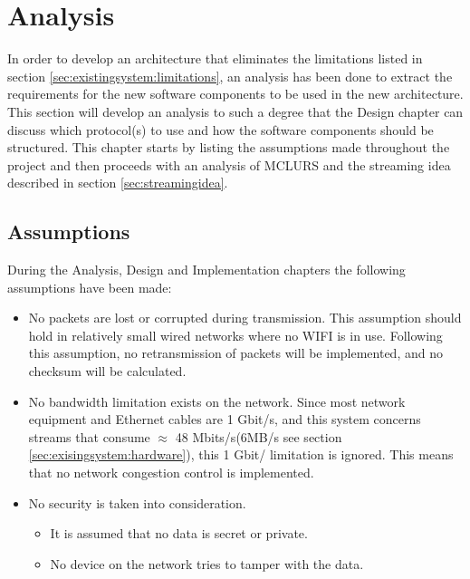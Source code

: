 \chapter{Analysis} \label{chp:analysis}
In order to develop an architecture that eliminates the limitations listed in section \ref{sec:existingsystem:limitations}, an analysis has been done to extract the requirements for the new software components to be used in the new architecture.
This section will develop an analysis to such a degree that the Design chapter can discuss which protocol(s) to use and how the software components should be structured. This chapter starts by listing the assumptions made throughout the project and then proceeds with an analysis of MCLURS and the streaming idea described in section \ref{sec:streamingidea}.



\section{Assumptions}
During the Analysis, Design and Implementation chapters the following assumptions have been made:
\begin{itemize}
	\item No packets are lost or corrupted during transmission. This assumption should hold in relatively small wired networks where no WIFI is in use. Following this assumption, no retransmission of packets will be implemented, and no checksum will be calculated.
	\item No bandwidth limitation exists on the network. Since most network equipment and Ethernet cables are 1 Gbit/s, and this system concerns streams that consume $\approx$ 48 Mbits/s(6MB/s see section \ref{sec:exisingsystem:hardware}), this 1 Gbit/ limitation is ignored. This means that no network congestion control is implemented. 
	
	\item No security is taken into consideration.
		\begin{itemize}
			\item It is assumed that no data is secret or private.
			\item No device on the network tries to tamper with the data.
		\end{itemize}
\end{itemize}

